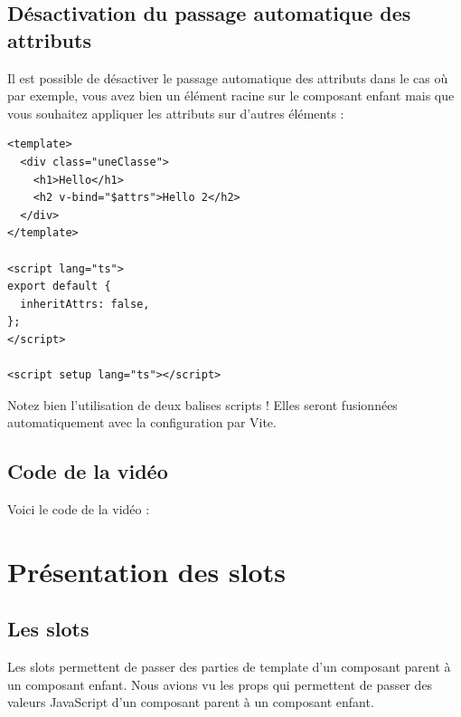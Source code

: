 \subsection{Désactivation du passage automatique des attributs}
Il est possible de désactiver le passage automatique des attributs dans le cas où par exemple, vous avez bien un élément racine sur le composant enfant mais que vous souhaitez appliquer les attributs sur d'autres éléments :
\begin{verbatim}
<template>
  <div class="uneClasse">
    <h1>Hello</h1>
    <h2 v-bind="$attrs">Hello 2</h2>
  </div>
</template>

<script lang="ts">
export default {
  inheritAttrs: false,
};
</script>

<script setup lang="ts"></script>
\end{verbatim}
Notez bien l'utilisation de deux balises {\color{monOrange}scripts} ! Elles seront fusionnées automatiquement avec la configuration par {\color{monOrange}Vite}.

\subsection{Code de la vidéo}
Voici le code de la vidéo :


\section{Présentation des slots}
\subsection{Les {\color{monOrange}slots}}
Les {\color{monOrange}slots} permettent de passer des parties de {\color{monOrange}template} d'un composant parent à un composant enfant. Nous avions vu les {\color{monOrange}props} qui permettent de passer des valeurs JavaScript d'un composant parent à un composant enfant.

